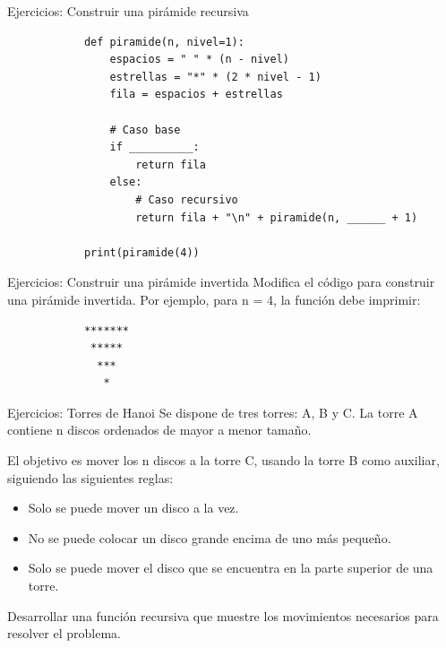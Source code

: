 \documentclass{beamer}
\begin{document}
    \begin{frame}[fragile, t]{Ejercicios: Construir una pirámide recursiva}
        \begin{verbatim}
            def piramide(n, nivel=1):
                espacios = " " * (n - nivel)
                estrellas = "*" * (2 * nivel - 1)
                fila = espacios + estrellas
                
                # Caso base
                if __________:
                    return fila
                else:
                    # Caso recursivo
                    return fila + "\n" + piramide(n, ______ + 1)

            print(piramide(4))
        \end{verbatim}
    \end{frame}

    \begin{frame}[fragile, t]{Ejercicios: Construir una pirámide invertida}
        Modifica el código para construir una pirámide invertida.
        Por ejemplo, para n = 4, la función debe imprimir:
        \begin{verbatim}
            *******
             *****
              ***
               *
        \end{verbatim}
        
    \end{frame}

    \begin{frame}{Ejercicios: Torres de Hanoi}
        Se dispone de tres torres: A, B y C. La torre A contiene n discos ordenados de mayor a menor tamaño.

        El objetivo es mover los n discos a la torre C, usando la torre B como auxiliar, siguiendo las siguientes reglas:
        \begin{itemize}
            \item Solo se puede mover un disco a la vez.
            \item No se puede colocar un disco grande encima de uno más pequeño.
            \item Solo se puede mover el disco que se encuentra en la parte superior de una torre.
        \end{itemize}
        
        Desarrollar una función recursiva que muestre los movimientos necesarios para resolver el problema.
        
    \end{frame}
\end{document}
